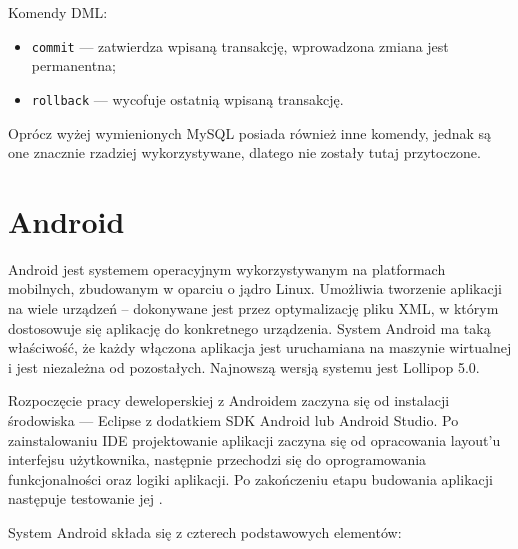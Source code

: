 \documentclass[eng,printmode,oneside]{mgr}
\begin{document}
Komendy DML:
\begin{itemize}
  \item \texttt{commit} --- zatwierdza wpisaną transakcję, wprowadzona zmiana jest
  permanentna;
  \item \texttt{rollback} --- wycofuje ostatnią wpisaną transakcję.
\end{itemize}

Oprócz wyżej wymienionych MySQL posiada również inne komendy, jednak są one
znacznie rzadziej wykorzystywane, dlatego nie zostały tutaj przytoczone.

\newpage
\section{Android}

Android jest systemem operacyjnym wykorzystywanym na platformach mobilnych,
zbudowanym w oparciu o jądro Linux. Umożliwia tworzenie aplikacji na wiele
urządzeń -- dokonywane jest przez optymalizację pliku XML, w którym dostosowuje
się aplikację do konkretnego urządzenia. System Android ma taką właściwość,
że każdy włączona aplikacja jest uruchamiana na maszynie
wirtualnej i jest niezależna od pozostałych. Najnowszą wersją systemu
jest Lollipop 5.0.

Rozpoczęcie pracy deweloperskiej z Androidem zaczyna się od instalacji
środowiska --- Eclipse z dodatkiem SDK Android lub Android Studio. Po
zainstalowaniu IDE projektowanie aplikacji zaczyna się od opracowania layout'u
interfejsu użytkownika, następnie przechodzi się do oprogramowania
funkcjonalności oraz logiki aplikacji. Po zakończeniu etapu budowania aplikacji
następuje testowanie jej \cite{developer.android}.

System Android składa się z czterech podstawowych elementów:
\end{document}
